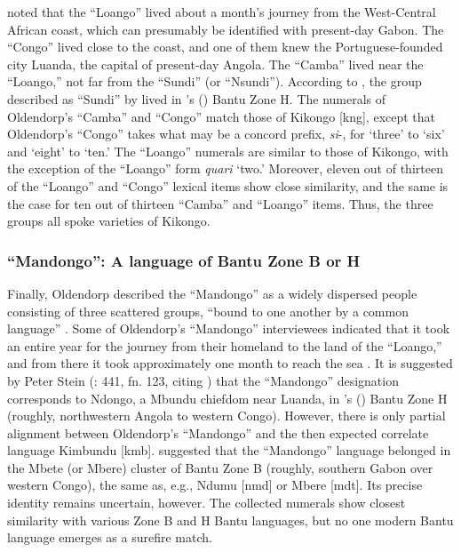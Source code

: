 \documentclass[output=paper,colorlinks,citecolor=brown]{langscibook}
\begin{document}
\citet[436--445]{Oldendorp_2000} noted that the ``Loango'' lived about a month's journey from the West-Central African coast, which can presumably be identified with present-day Gabon. The “Congo” lived close to the coast, and one of them knew the Portuguese-founded city Luanda, the capital of present-day Angola. The ``Camba'' lived near the ``Loango,'' not far from the ``Sundi'' (or ``Nsundi''). According to \citet[85]{Dalby_1964}, the group described as ``Sundi'' by \citet{Koelle_1854} lived in \citeauthor{Guthrie_1948}'s (\citeyear{Guthrie_1948}) Bantu Zone H. The numerals of Oldendorp's ``Camba'' and ``Congo'' match those of Kikongo [kng], except that Oldendorp's ``Congo'' takes what may be a concord prefix, \emph{si}-, for `three' to `six' and `eight' to `ten.' The ``Loango'' numerals are similar to those of Kikongo, with the exception of the ``Loango'' form \emph{quari} `two.' Moreover, eleven out of thirteen of the ``Loango'' and ``Congo'' lexical items show close similarity, and the same is the case for ten out of thirteen ``Camba'' and ``Loango'' items. Thus, the three groups all spoke varieties of Kikongo.

\subsubsection{``Mandongo'': A language of Bantu Zone B or H}

Finally, Oldendorp described the ``Mandongo'' as a widely dispersed people consisting of three scattered groups, ``bound to one another by a common language'' \citep[168]{Highfield_1987}. Some of Oldendorp's ``Mandongo'' interviewees indicated that it took an entire year for the journey from their homeland to the land of the ``Loango,'' and from there it took approximately one month to reach the sea \citep[442]{Oldendorp_2000}. It is suggested by Peter Stein (\cite{Oldendorp_2000}: 441, fn. 123, citing \cite{Birmingham_1966}) that the ``Mandongo'' designation corresponds to Ndongo, a Mbundu chiefdom near Luanda, in \citeauthor{Guthrie_1948}'s (\citeyear{Guthrie_1948}) Bantu Zone H (roughly, northwestern Angola to western Congo). However, there is only partial alignment between Oldendorp's ``Mandongo'' and the then expected correlate language Kimbundu [kmb]. \citet[152]{Fodor_1975} suggested that the ``Mandongo'' language belonged in the Mbete (or Mbere) cluster of Bantu Zone B (roughly, southern Gabon over western Congo), the same as, e.g., Ndumu [nmd] or Mbere [mdt]. Its precise identity remains uncertain, however. The collected numerals show closest similarity with various Zone B and H Bantu languages, but no one modern Bantu language emerges as a surefire match.
\end{document}

